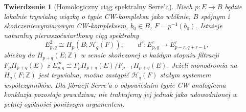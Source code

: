 \documentclass[11pt,a4paper,oneside]{report}
\newcommand{\Z}{\mathbb{Z}}
\theoremstyle{plain}
\newtheorem{twierdzenie}{Twierdzenie}[section]
\theoremstyle{definition}
\theoremstyle{remark}
\begin{document}
\begin{twierdzenie}[Homologiczny ciąg spektralny Serre'a]
\label{thm:serre-v5}
Niech $p:E\to B$ będzie lokalnie trywialną wiązką o typie
CW-kompleksu jako włóknie, $B$ spójnym i skończeniewymiarowym
CW-kompleksem, $b_0\in B$, $F=p^{-1}(b_0)$.
Istnieje naturalny pierwszoćwiartkowy ciąg spektralny
\[
E^2_{p,q}\cong H_p(B;\mathcal H_q(F)),\qquad
 d^r:E^r_{p,q}\longrightarrow E^r_{p-r,q+r-1},
\]
zbieżny do $H_{p+q}(E;\Z)$ w sensie skończonej w każdym
stopniu filtracji $F_pH_{p+q}(E)$ z
$E^\infty_{p,q}\cong F_pH_{p+q}(E)/F_{p-1}H_{p+q}(E)$.
Jeżeli monodromia na $H_q(F;\Z)$ jest trywialna, można
zastąpić $\mathcal H_q(F)$ stałym systemem współczynników.
Dla fibracji Serre'a o odpowiednim typie CW analogiczna
konkluzja pozostaje prawdziwa; nie traktujemy jej jednak
jako udowodnionej w pełnej ogólności poniższym argumentem.
\end{twierdzenie}
\end{document}
